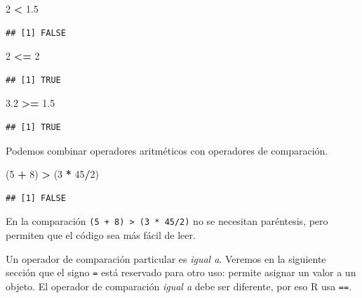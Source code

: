 \documentclass[]{book}
\makeatletter
\newenvironment{Shaded}{\begin{snugshade}}{\end{snugshade}}
\newcommand{\DecValTok}[1]{\textcolor[rgb]{0.00,0.00,0.81}{#1}}
\newcommand{\FloatTok}[1]{\textcolor[rgb]{0.00,0.00,0.81}{#1}}
\newcommand{\StringTok}[1]{\textcolor[rgb]{0.31,0.60,0.02}{#1}}
\newcommand{\OperatorTok}[1]{\textcolor[rgb]{0.81,0.36,0.00}{\textbf{#1}}}
\newcommand{\NormalTok}[1]{#1}
\newenvironment{kframe}{%
\medskip{}
\setlength{\fboxsep}{.8em}
 \def\at@end@of@kframe{}%
 \ifinner\ifhmode%
  \def\at@end@of@kframe{\end{minipage}}%
  \begin{minipage}{\columnwidth}%
 \fi\fi%
 \def\FrameCommand##1{\hskip\@totalleftmargin \hskip-\fboxsep
 \colorbox{shadecolor}{##1}\hskip-\fboxsep
     \hskip-\linewidth \hskip-\@totalleftmargin \hskip\columnwidth}%
 \MakeFramed {\advance\hsize-\width
   \@totalleftmargin\z@ \linewidth\hsize
   \@setminipage}}%
 {\par\unskip\endMakeFramed%
 \at@end@of@kframe}
\newenvironment{rmdblock}[1]
  {
  \begin{itemize}
  \renewcommand{\labelitemi}{
    \raisebox{-.7\height}[0pt][0pt]{
      {\setkeys{Gin}{width=3em,keepaspectratio}\texttt{[image: myIcons/\#1]}} %
    }
  }
  \setlength{\fboxsep}{1em}
  \begin{kframe}
  \item
  }
  {
  \end{kframe}
  \end{itemize}
  }
\newenvironment{rmdstyle}     %
  {\begin{rmdblock}{style}}   %
  {\end{rmdblock}}            %
\makeatother
\begin{document}
\begin{Shaded}
\begin{Highlighting}[]
\DecValTok{2} \OperatorTok{<}\StringTok{ }\FloatTok{1.5}
\end{Highlighting}
\end{Shaded}

\begin{verbatim}
## [1] FALSE
\end{verbatim}

\begin{Shaded}
\begin{Highlighting}[]
\DecValTok{2} \OperatorTok{<=}\StringTok{ }\DecValTok{2}
\end{Highlighting}
\end{Shaded}

\begin{verbatim}
## [1] TRUE
\end{verbatim}

\begin{Shaded}
\begin{Highlighting}[]
\FloatTok{3.2} \OperatorTok{>=}\StringTok{ }\FloatTok{1.5}
\end{Highlighting}
\end{Shaded}

\begin{verbatim}
## [1] TRUE
\end{verbatim}

Podemos combinar operadores aritméticos con operadores de comparación.

\begin{Shaded}
\begin{Highlighting}[]
\NormalTok{(}\DecValTok{5} \OperatorTok{+}\StringTok{ }\DecValTok{8}\NormalTok{) }\OperatorTok{>}\StringTok{ }\NormalTok{(}\DecValTok{3} \OperatorTok{*}\StringTok{ }\DecValTok{45}\OperatorTok{/}\DecValTok{2}\NormalTok{) }
\end{Highlighting}
\end{Shaded}

\begin{verbatim}
## [1] FALSE
\end{verbatim}

\begin{rmdstyle}
En la comparación \texttt{(5\ +\ 8)\ \textgreater{}\ (3\ *\ 45/2)} no se
necesitan paréntesis, pero permiten que el código sea más fácil de leer.
\end{rmdstyle}

Un operador de comparación particular es \emph{igual a}. Veremos en la
siguiente sección que el signo \texttt{=} está reservado para otro uso:
permite asignar un valor a un objeto. El operador de comparación
\emph{igual a} debe ser diferente, por eso R usa \texttt{==}.
\end{document}
